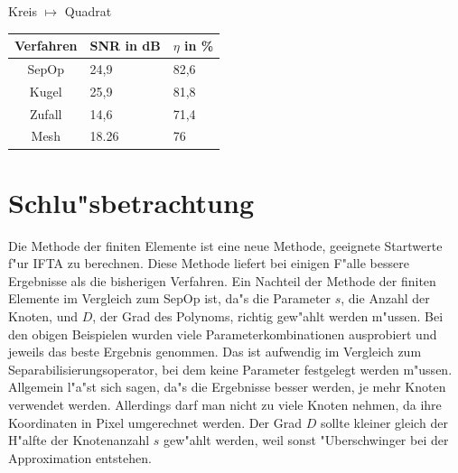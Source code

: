 \documentclass[11pt,a4paper]{article}
\begin{document}
  \begin{center}{\large Kreis	$\mapsto$ Quadrat} \\
  \begin{tabular}{|c|l|l|} \hline
    Verfahren   & SNR in dB & $\eta$ in \% \\ \hline\hline
    SepOp	& 24,9	 & 82,6	 \\
    Kugel	& 25,9	 & 81,8	 \\
    Zufall	& 14,6	 & 71,4	 \\
    Mesh	& 18.26	 & 76	 \\ \hline
  \end{tabular}\end{center} 
\section{Schlu"sbetrachtung}
  Die Methode der finiten Elemente ist eine neue Methode, geeignete Startwerte
  f"ur IFTA zu berechnen. Diese Methode liefert bei einigen F"alle bessere Ergebnisse
  als die bisherigen Verfahren. Ein Nachteil der Methode der finiten Elemente im
  Vergleich zum SepOp ist, da"s die Parameter $s$, die Anzahl der Knoten, und $D$, der
  Grad des Polynoms, richtig gew"ahlt werden m"ussen. Bei den obigen Beispielen
  wurden viele Parameterkombinationen ausprobiert und jeweils das beste Ergebnis
  genommen. Das ist aufwendig im Vergleich zum Separabilisierungsoperator, bei dem keine
  Parameter festgelegt werden
  m"ussen. Allgemein l"a"st sich sagen, da"s die Ergebnisse besser werden, je mehr Knoten
  verwendet werden. Allerdings darf man nicht zu viele Knoten nehmen, da ihre Koordinaten
  in Pixel umgerechnet werden. Der Grad $D$ sollte kleiner gleich der H"alfte der
  Knotenanzahl $s$ gew"ahlt werden, weil sonst "Uberschwinger bei der
  Approximation entstehen.   
\end{document}
